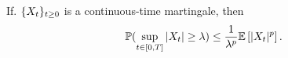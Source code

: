 \documentclass[../TGMAFFIRO.tex]{subfiles}
\begin{document}
\begin{theorem}\label{th:doob_martingale}
	If. $\{X_t\}_{t\geq 0}$ is a continuous-time martingale, then 
	\begin{equation}
		\mathbb{P}(\sup_{t\in [0, T]} |X_t| \geq \lambda) \leq \frac{1}{\lambda^p}\mathbb{E}\left[|X_t|^p\right].
	\end{equation}
	
\end{theorem}

	
\end{document}
